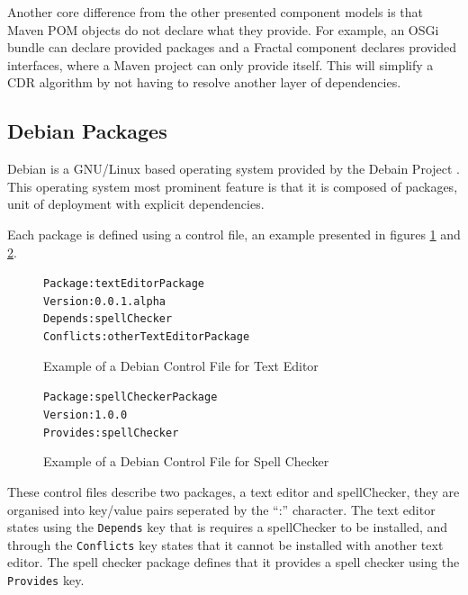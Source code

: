 Another core difference from the other presented component models is that Maven POM objects do not declare what they provide.
For example, an OSGi bundle can declare provided packages and a Fractal component declares provided interfaces, where a Maven project can only provide itself.
This will simplify a CDR algorithm by not having to resolve another layer of dependencies.

\subsection{Debian Packages}
Debian is a GNU/Linux based operating system provided by the Debain Project \citep{Barth2005}.
This operating system most prominent feature is that it is composed of packages, unit of deployment with explicit dependencies.

Each package is defined using a control file, an example presented in figures \ref{debianmetadatate} and \ref{debianmetadatasc}.

\begin{figure}[htp]
\begin{center}
\begin{alltt}
Package: textEditorPackage
Version: 0.0.1.alpha
Depends: spellChecker
Conflicts: otherTextEditorPackage
\end{alltt}
  \caption[Debian Control file for Text Editor]{Example of a Debian Control File for Text Editor}
  \label{debianmetadatate}
\end{center}
\end{figure}

\begin{figure}[htp]
\begin{center}
\begin{alltt}
Package: spellCheckerPackage
Version: 1.0.0
Provides: spellChecker
\end{alltt}
  \caption[Debian Control files for Spell Checker]{Example of a Debian Control File for Spell Checker}
  \label{debianmetadatasc}
\end{center}
\end{figure}

These control files describe two packages, a text editor and spellChecker, they are organised into key/value pairs seperated by the ``:'' character.
The text editor states using the \verb+Depends+ key that is requires a spellChecker to be installed, 
and through the \verb+Conflicts+ key states that it cannot be installed with another text editor.
The spell checker package defines that it provides a spell checker  using the \verb+Provides+ key.

